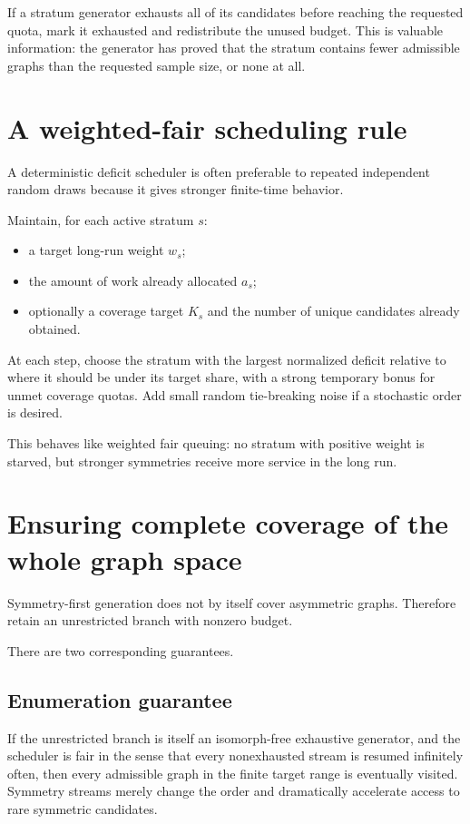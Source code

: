 \documentclass[11pt]{article}
\begin{document}
If a stratum generator exhausts all of its candidates before reaching the requested quota, mark it exhausted and redistribute the unused budget. This is valuable information: the generator has proved that the stratum contains fewer admissible graphs than the requested sample size, or none at all.

\section{A weighted-fair scheduling rule}

A deterministic deficit scheduler is often preferable to repeated independent random draws because it gives stronger finite-time behavior.

Maintain, for each active stratum \(s\):
\begin{itemize}
  \item a target long-run weight \(w_s\);
  \item the amount of work already allocated \(a_s\);
  \item optionally a coverage target \(K_s\) and the number of unique candidates already obtained.
\end{itemize}

At each step, choose the stratum with the largest normalized deficit relative to where it should be under its target share, with a strong temporary bonus for unmet coverage quotas. Add small random tie-breaking noise if a stochastic order is desired.

This behaves like weighted fair queuing: no stratum with positive weight is starved, but stronger symmetries receive more service in the long run.

\section{Ensuring complete coverage of the whole graph space}

Symmetry-first generation does not by itself cover asymmetric graphs. Therefore retain an unrestricted branch with nonzero budget.

There are two corresponding guarantees.

\subsection{Enumeration guarantee}

If the unrestricted branch is itself an isomorph-free exhaustive generator, and the scheduler is fair in the sense that every nonexhausted stream is resumed infinitely often, then every admissible graph in the finite target range is eventually visited. Symmetry streams merely change the order and dramatically accelerate access to rare symmetric candidates.
\end{document}
